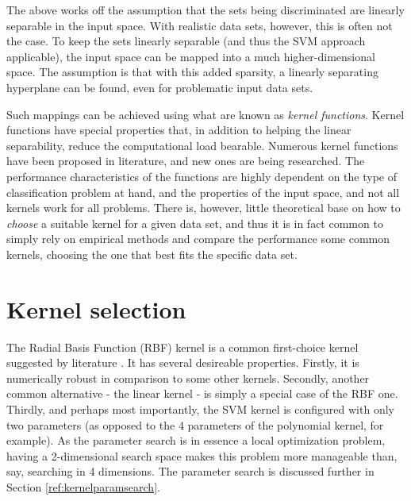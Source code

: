 \documentclass{netsec2012}
\begin{document}
The above works off the assumption that the sets being discriminated are linearly separable in the
input space.  With realistic data sets, however, this is often not the case.  To keep the sets
linearly separable (and thus the SVM approach applicable), the input space can be mapped into a much
higher-dimensional space.  The assumption is that with this added sparsity, a linearly separating
hyperplane can be found, even for problematic input data sets. \cite{svm_chemistry}

Such mappings can be achieved using what are known as \emph{kernel functions}.  Kernel functions
have special properties that, in addition to helping the linear separability, reduce the
computational load bearable.  Numerous kernel functions have been proposed in literature, and new
ones are being researched.  The performance characteristics of the functions are highly dependent on
the type of classification problem at hand, and the properties of the input space, and not all
kernels work for all problems.  There is, however, little theoretical base on how to \emph{choose} a
suitable kernel for a given data set, and thus it is in fact common to simply rely on empirical
methods and compare the performance some common kernels, choosing the one that best fits the
specific data set. \cite{svm_chemistry}

%
%
%

\section{Kernel selection}

The Radial Basis Function (RBF) kernel is a common first-choice kernel suggested by literature
\cite{libsvm_guide,svm_chemistry}. It has several desireable properties.  Firstly, it is numerically
robust in comparison to some other kernels.  Secondly, another common alternative - the linear
kernel - is simply a special case of the RBF one.  Thirdly, and perhaps most importantly, the SVM
kernel is configured with only two parameters (as opposed to the 4 parameters of the polynomial
kernel, for example).  As the parameter search is in essence a local optimization problem, having a
2-dimensional search space makes this problem more manageable than, say, searching in 4 dimensions.
The parameter search is discussed further in Section \ref{ref:kernelparamsearch}. \cite{libsvm_guide}
\end{document}
